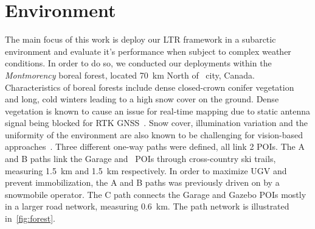 \section{Environment}
\label{sec:env}

The main focus of this work is deploy our \ac{LTR} framework in a subarctic environment and evaluate it's performance when subject to complex weather conditions.
In order to do so, we conducted our deployments within the \textit{Montmorency} boreal forest, located \SI{70}{km} North of \quebec~city, Canada.
Characteristics of boreal forests include dense closed-crown conifer vegetation~\citep{Russell1988} and long, cold winters leading to a high snow cover on the ground.
Dense vegetation is known to cause an issue for real-time mapping due to static antenna signal being blocked for \ac{RTK} \ac{GNSS}~\citep{Babin2019}.
Snow cover, illumination variation and the uniformity of the environment are also known to be challenging for vision-based approaches~\citep{Paton2017}.
Three different one-way paths were defined, all link 2 \acp{POI}.
The A  and B paths link the Garage and \laverdiere~\acp{POI} through cross-country ski trails, measuring \SI{1.5}{km} and \SI{1.5}{km} respectively.
In order to maximize \ac{UGV} and prevent immobilization, the A and B paths was previously driven on by a snowmobile operator.
The C path connects the Garage and Gazebo \acp{POI} mostly in a larger road network, measuring \SI{0.6}{km}.
The path network is illustrated in~\autoref{fig:forest}.

